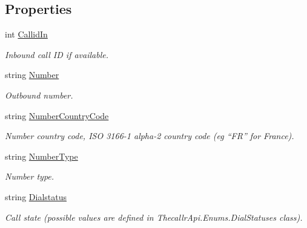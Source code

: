 \subsection*{Properties}
\begin{DoxyCompactItemize}
\item 
int \hyperlink{class_thecallr_api_1_1_objects_1_1_cdr_1_1_cdr_out_a312799a8b4cff10347a3b535ffd113fd}{Callid\+In}
\begin{DoxyCompactList}\small\item\em Inbound call I\+D if available. \end{DoxyCompactList}\item 
string \hyperlink{class_thecallr_api_1_1_objects_1_1_cdr_1_1_cdr_out_aa53b71447be3a82fdff0e65198abbb86}{Number}
\begin{DoxyCompactList}\small\item\em Outbound number. \end{DoxyCompactList}\item 
string \hyperlink{class_thecallr_api_1_1_objects_1_1_cdr_1_1_cdr_out_a1711e4341fa0aea1c3eedf63969f2b8f}{Number\+Country\+Code}
\begin{DoxyCompactList}\small\item\em Number country code, I\+S\+O 3166-\/1 alpha-\/2 country code (eg “\+F\+R” for France). \end{DoxyCompactList}\item 
string \hyperlink{class_thecallr_api_1_1_objects_1_1_cdr_1_1_cdr_out_ad352c614bc31cdfb578bf3de4447fa6e}{Number\+Type}
\begin{DoxyCompactList}\small\item\em Number type. \end{DoxyCompactList}\item 
string \hyperlink{class_thecallr_api_1_1_objects_1_1_cdr_1_1_cdr_out_a3226b8ef9370dbb420fa9bd4ec2f29d2}{Dialstatus}
\begin{DoxyCompactList}\small\item\em Call state (possible values are defined in Thecallr\+Api.\+Enums.\+Dial\+Statuses class). \end{DoxyCompactList}\end{DoxyCompactItemize}


